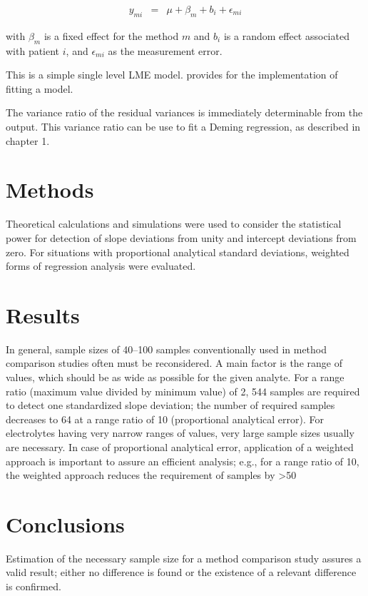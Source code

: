 \documentclass[12pt, a4paper]{report}
\theoremstyle{plain}
\theoremstyle{definition}
\theoremstyle{remark}
\begin{document}
\begin{eqnarray*}
	y_{mi} &=& \mu + \beta_{m} + b_{i} + \epsilon_{mi}
\end{eqnarray*}

with $\beta_{m}$ is a fixed effect for the method $m$ and $b_{i}$
is a random effect associated with patient $i$, and
$\epsilon_{mi}$ as the measurement error.

This is a simple single level LME model. \citet{pb} provides for
the implementation of fitting a model.

The variance ratio of the residual variances is immediately
determinable from the output. This variance ratio can be use to
fit a Deming regression, as described in chapter 1.






\section{Methods} 
Theoretical calculations and simulations were used to consider the statistical power for detection of slope deviations from 
unity and intercept deviations from zero. For situations with proportional analytical standard deviations, weighted forms of regression analysis were evaluated.

\section{Results} In general, sample sizes of 40–100 samples conventionally used in method comparison studies often must 
be reconsidered. A main factor is the range of values, which should be as wide as possible for the given analyte. 
For a range ratio (maximum value divided by minimum value) of 2, 544 samples are required to detect one standardized slope 
deviation; the number of required samples decreases to 64 at a range ratio of 10 (proportional analytical error). For electrolytes having very narrow ranges of values, very large sample sizes usually are necessary. In case of proportional analytical error, application of a weighted approach is important to assure an efficient analysis; e.g., for a range ratio of 10, the weighted approach reduces the requirement of samples by >50%

\section{Conclusions} Estimation of the necessary sample size for a method comparison study assures a valid result; either no difference is found or the existence of a relevant difference is confirmed.
\end{document}
